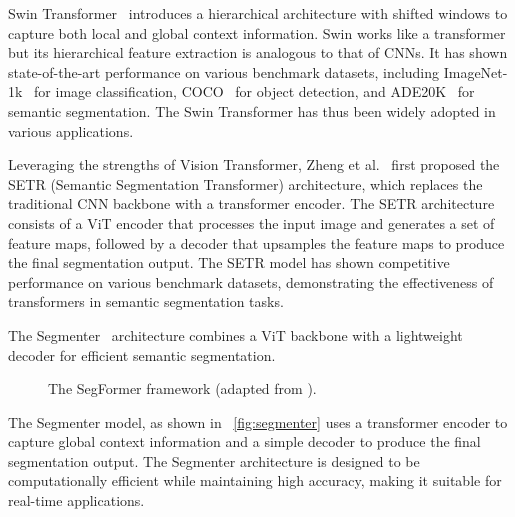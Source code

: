 Swin Transformer~\cite{transformer_swin} introduces a hierarchical architecture with shifted windows to capture both local and global context information. Swin works like a transformer but its hierarchical feature extraction is analogous to that of CNNs. It has shown state-of-the-art performance on various benchmark datasets, including ImageNet-1k~\cite{dataset_imagenet} for image classification, COCO~\cite{dataset_coco} for object detection, and ADE20K~\cite{dataset_ade20k} for semantic segmentation. The Swin Transformer has thus been widely adopted in various applications.

Leveraging the strengths of Vision Transformer, Zheng et al.~\cite{fsss_setr} first proposed the SETR (Semantic Segmentation Transformer) architecture, which replaces the traditional CNN backbone with a transformer encoder. The SETR architecture consists of a ViT encoder that processes the input image and generates a set of feature maps, followed by a decoder that upsamples the feature maps to produce the final segmentation output. The SETR model has shown competitive performance on various benchmark datasets, demonstrating the effectiveness of transformers in semantic segmentation tasks.

The Segmenter~\cite{fsss_segmenter} architecture combines a ViT backbone with a lightweight decoder for efficient semantic segmentation. 
\begin{figure}[htbp]
    \centering
    \caption{The SegFormer framework (adapted from \cite{fsss_segmenter}).}
    \label{fig:segmenter}
\end{figure}

The Segmenter model, as shown in ~\autoref{fig:segmenter} uses a transformer encoder to capture global context information and a simple decoder to produce the final segmentation output. The Segmenter architecture is designed to be computationally efficient while maintaining high accuracy, making it suitable for real-time applications.

